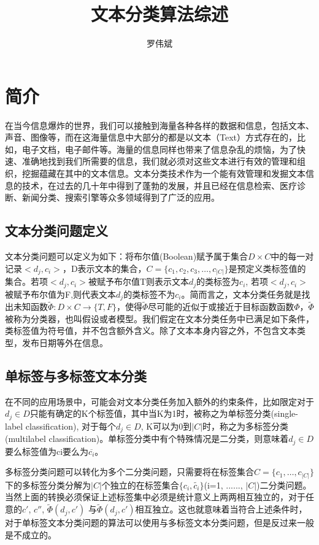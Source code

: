 \documentclass[UTF8]{ctexart}
\title{文本分类算法综述}
\author{罗伟斌}
\begin{document}
\maketitle
\section{简介}
	在当今信息爆炸的世界，我们可以接触到海量各种各样的数据和信息，包括文本、声音、图像等，而在这海量信息中大部分的都是以文本（Text）方式存在的，比如，电子文档，电子邮件等。海量的信息同样也带来了信息杂乱的烦恼，为了快速、准确地找到我们所需要的信息，我们就必须对这些文本进行有效的管理和组织，挖掘蕴藏在其中的文本信息。文本分类技术作为一个能有效管理和发掘文本信息的技术，在过去的几十年中得到了蓬勃的发展，并且已经在信息检索、医疗诊断、新闻分类、搜索引擎等众多领域得到了广泛的应用。

\subsection{文本分类问题定义}
	\par 文本分类问题可以定义为如下：将布尔值(Boolean)赋予属于集合$D×C$中的每一对记录$<d_j , c_i>$，D表示文本的集合，$C=\{c_1 , c_2 , c_3 ,\ldots , c_{|C|}\}$是预定义类标签值的集合。若项$<d_j, c_i>$被赋予布尔值T则表示文本$d_j$的类标签为$c_i$, 若项$<d_j,c_i>$被赋予布尔值为F,则代表文本$d_j$的类标签不为$c_i$。简而言之，文本分类任务就是找出未知函数$\tilde{\Phi}:D×C\to\{T,F\}$，使得$\tilde{\Phi}$尽可能的近似于或接近于目标函数函数$\Phi$，$\tilde{\Phi}$被称为分类器，也叫假设或者模型。我们假定在文本分类任务中已满足如下条件，类标签值为符号值，并不包含额外含义。除了文本本身内容之外，不包含文本类型，发布日期等外在信息。

\subsection{单标签与多标签文本分类}
	\par 在不同的应用场景中，可能会对文本分类任务加入额外的约束条件，比如限定对于$d_j\in D$只能有确定的K个标签值，其中当K为1时，被称之为单标签分类(single-label classification), 对于每个$d_j\in D$, K可以为0到$|C|$时，称之为多标签分类(multilabel classification)。单标签分类中有个特殊情况是二分类，则意味着$d_j\in D$要么标签值为ci要么为$\overline{c_i}$。
	\par 多标签分类问题可以转化为多个二分类问题，只需要将在标签集合$C=\{c_1,\ldots, c_{|C|}\}$下的多标签分类分解为$\vert C \vert$个独立的在标签集合$\{c_i, \tilde{c_i} \}$(i=1, ......, $\vert C \vert$)二分类问题。当然上面的转换必须保证上述标签集中必须是统计意义上两两相互独立的，对于任意的$c'$, $c''$, $\tilde{\Phi}(d_j, c')$
	与$\tilde{\Phi}(d_j, c')$相互独立。这也就意味着当符合上述条件时，对于单标签文本分类问题的算法可以使用与多标签文本分类问题，但是反过来一般是不成立的。
\end{document}
